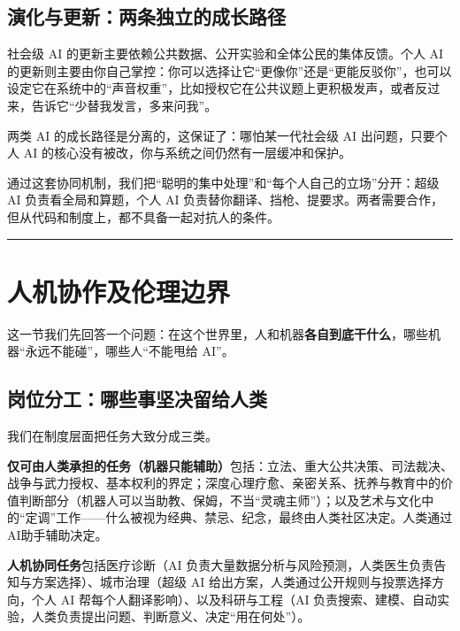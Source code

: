 \subsection{演化与更新：两条独立的成长路径}\label{ux6f14ux5316ux4e0eux66f4ux65b0ux4e24ux6761ux72ecux7acbux7684ux6210ux957fux8defux5f84}

社会级 AI 的更新主要依赖公共数据、公开实验和全体公民的集体反馈。个人 AI 的更新则主要由你自己掌控：你可以选择让它``更像你''还是``更能反驳你''，也可以设定它在系统中的``声音权重''，比如授权它在公共议题上更积极发声，或者反过来，告诉它``少替我发言，多来问我''。

两类 AI 的成长路径是分离的，这保证了：哪怕某一代社会级 AI 出问题，只要个人 AI 的核心没有被改，你与系统之间仍然有一层缓冲和保护。

通过这套协同机制，我们把``聪明的集中处理''和``每个人自己的立场''分开：超级 AI 负责看全局和算题，个人 AI 负责替你翻译、挡枪、提要求。两者需要合作，但从代码和制度上，都不具备一起对抗人的条件。

\begin{center}\rule{0.5\linewidth}{0.5pt}\end{center}

\section{人机协作及伦理边界}\label{ux4ebaux673aux534fux4f5cux53caux4f26ux7406ux8fb9ux754c}

这一节我们先回答一个问题：在这个世界里，人和机器\textbf{各自到底干什么}，哪些机器``永远不能碰''，哪些人``不能甩给 AI''。

\subsection{岗位分工：哪些事坚决留给人类}\label{ux5c97ux4f4dux5206ux5de5ux54eaux4e9bux4e8bux575aux51b3ux7559ux7ed9ux4ebaux7c7b}

我们在制度层面把任务大致分成三类。

\textbf{仅可由人类承担的任务（机器只能辅助）}包括：立法、重大公共决策、司法裁决、战争与武力授权、基本权利的界定；深度心理疗愈、亲密关系、抚养与教育中的价值判断部分（机器人可以当助教、保姆，不当``灵魂主师''）；以及艺术与文化中的``定调''工作------什么被视为经典、禁忌、纪念，最终由人类社区决定。人类通过AI助手辅助决定。

\textbf{人机协同任务}包括医疗诊断（AI 负责大量数据分析与风险预测，人类医生负责告知与方案选择）、城市治理（超级 AI 给出方案，人类通过公开规则与投票选择方向，个人 AI 帮每个人翻译影响）、以及科研与工程（AI 负责搜索、建模、自动实验，人类负责提出问题、判断意义、决定``用在何处''）。

